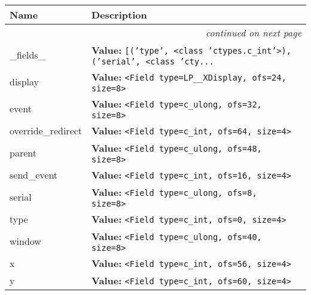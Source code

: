     \vspace{-1cm}
\hspace{\varindent}\begin{longtable}{|p{\varnamewidth}|p{\vardescrwidth}|l}
\cline{1-2}
\cline{1-2} \centering \textbf{Name} & \centering \textbf{Description}& \\
\cline{1-2}
\endhead\cline{1-2}\multicolumn{3}{r}{\small\textit{continued on next page}}\\\endfoot\cline{1-2}
\endlastfoot\raggedright \_\-f\-i\-e\-l\-d\-s\-\_\- & \raggedright \textbf{Value:} 
{\tt \texttt{[}\texttt{(}\texttt{'}\texttt{type}\texttt{'}\texttt{, }{\textless}class 'ctypes.c\_int'{\textgreater}\texttt{)}\texttt{, }\texttt{(}\texttt{'}\texttt{serial}\texttt{'}\texttt{, }{\textless}class 'cty\texttt{...}}&\\
\cline{1-2}
\raggedright d\-i\-s\-p\-l\-a\-y\- & \raggedright \textbf{Value:} 
{\tt {\textless}Field type=LP\_\_XDisplay, ofs=24, size=8{\textgreater}}&\\
\cline{1-2}
\raggedright e\-v\-e\-n\-t\- & \raggedright \textbf{Value:} 
{\tt {\textless}Field type=c\_ulong, ofs=32, size=8{\textgreater}}&\\
\cline{1-2}
\raggedright o\-v\-e\-r\-r\-i\-d\-e\-\_\-r\-e\-d\-i\-r\-e\-c\-t\- & \raggedright \textbf{Value:} 
{\tt {\textless}Field type=c\_int, ofs=64, size=4{\textgreater}}&\\
\cline{1-2}
\raggedright p\-a\-r\-e\-n\-t\- & \raggedright \textbf{Value:} 
{\tt {\textless}Field type=c\_ulong, ofs=48, size=8{\textgreater}}&\\
\cline{1-2}
\raggedright s\-e\-n\-d\-\_\-e\-v\-e\-n\-t\- & \raggedright \textbf{Value:} 
{\tt {\textless}Field type=c\_int, ofs=16, size=4{\textgreater}}&\\
\cline{1-2}
\raggedright s\-e\-r\-i\-a\-l\- & \raggedright \textbf{Value:} 
{\tt {\textless}Field type=c\_ulong, ofs=8, size=8{\textgreater}}&\\
\cline{1-2}
\raggedright t\-y\-p\-e\- & \raggedright \textbf{Value:} 
{\tt {\textless}Field type=c\_int, ofs=0, size=4{\textgreater}}&\\
\cline{1-2}
\raggedright w\-i\-n\-d\-o\-w\- & \raggedright \textbf{Value:} 
{\tt {\textless}Field type=c\_ulong, ofs=40, size=8{\textgreater}}&\\
\cline{1-2}
\raggedright x\- & \raggedright \textbf{Value:} 
{\tt {\textless}Field type=c\_int, ofs=56, size=4{\textgreater}}&\\
\cline{1-2}
\raggedright y\- & \raggedright \textbf{Value:} 
{\tt {\textless}Field type=c\_int, ofs=60, size=4{\textgreater}}&\\
\cline{1-2}
\end{longtable}

